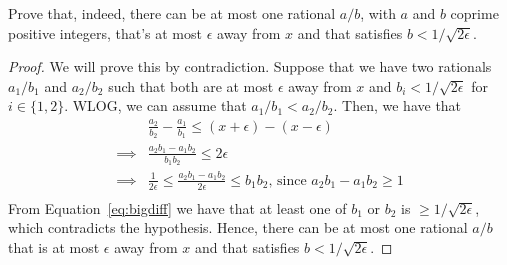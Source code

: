 \begin{solution}[label=ques:2a]
  \begin{question}
    Prove that, indeed, there can be at most one rational $a/b$, with $a$ and $b$ coprime positive integers, that's at most $\epsilon$ away from $x$ and that satisfies $b < 1 / \sqrt{2 \epsilon}$.
  \end{question}
  \tcblower{}
  \begin{proof}
    We will prove this by contradiction. Suppose that we have two rationals $a_1/b_1$ and $a_2/b_2$ such that both are at most $\epsilon$ away from $x$ and $b_i < 1 / \sqrt{2 \epsilon}$ for $i \in \{1, 2\}$. WLOG, we can assume that $a_1/b_1 < a_2/b_2$. Then, we have that
    \begin{equation}
      \begin{split}
        &\frac{a_2}{b_2} - \frac{a_1}{b_1} \leq (x + \epsilon) - (x - \epsilon)\\
        \implies &\frac{a_2 b_1 - a_1 b_2}{b_1 b_2} \leq 2 \epsilon\\
        \implies & \frac{1}{2 \epsilon} \leq \frac{a_2 b_1 - a_1 b_2}{2 \epsilon} \leq b_1 b_2\text{, since }a_2 b_1 - a_1 b_2 \geq 1\\
      \end{split}
      \label{eq:bigdiff}
    \end{equation}
    From Equation~\ref{eq:bigdiff} we have that at least one of $b_1$ or $b_2$ is $\geq 1 / \sqrt{2 \epsilon}$, which contradicts the hypothesis. Hence, there can be at most one rational $a/b$ that is at most $\epsilon$ away from $x$ and that satisfies $b < 1 / \sqrt{2 \epsilon}$.
  \end{proof}
\end{solution}

